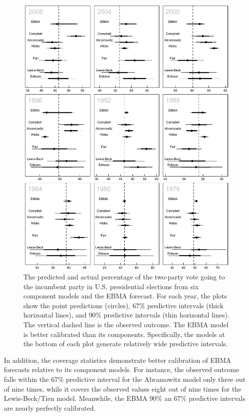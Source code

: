  \begin{figure}[ht!]
   \caption{\footnotesize The predicted and actual percentage of the
     two-party vote going to the incumbent party in U.S. presidential
     elections from six component models and the EBMA forecast.  For
     each year, the plots show the point predictions (circles), 67\%
     predictive intervals (thick horizontal lines), and 90\%
     predictive intervals (thin horizontal lines).  The vertical
     dashed line is the observed outcome.  The EBMA model is
   better calibrated than its components.  Specifically, the
   models at the bottom of each plot generate relatively wide
   predictive intervals.}
 \label{PresPlots2}
 \begin{center}
 \includegraphics[width=5.6 in]{PresPlot2.PDF}
 \end{center}
 \end{figure}


 In addition, the coverage statistics demonstrate better calibration
 of EBMA forecasts relative to its component models.  For instance,
 the observed outcome falls within the 67\% predictive interval for
 the Abramowitz model only three out of nine times, while it covers the
 observed values eight out of nine times for the Lewis-Beck/Tien
 model.  Meanwhile, the EBMA 90\% an 67\% predictive intervals are
 nearly perfectly calibrated.

